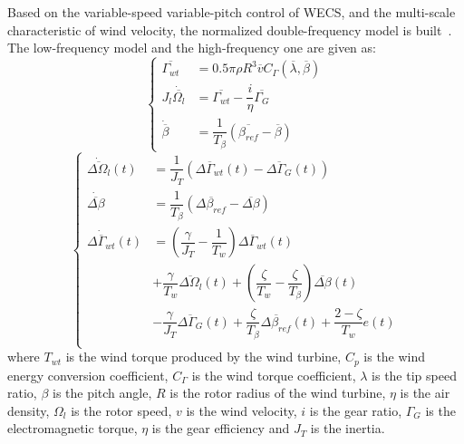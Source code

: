 \documentclass[english]{cccconf}
\begin{document}
Based on the variable-speed variable-pitch control of WECS, and the multi-scale
characteristic of wind velocity, the normalized double-frequency model is built~\cite{lit:6,lit:7}.
The low-frequency model and the high-frequency one are given as:
\begin{equation}\label{e:1}
\begin{cases}
\overline{\Gamma_{wt}}       & = 0.5\pi\rho{}R^3\overline{v}C_\Gamma(\overline{\lambda}, \overline{\beta}) \\
J_l\dot{\overline{\Omega_l}} & = \overline{\Gamma_{wt}}-\dfrac{i}{\eta}\overline{\Gamma_G} \\
\dot{\overline{\beta}}       & = \dfrac{1}{T_\beta}(\overline{\beta_{ref}} - \overline{\beta})
\end{cases}
\end{equation}
\begin{equation}\label{e:2}
\begin{cases}
\dot{\overline{\Delta\Omega_l}}(t) & = \dfrac{1}{J_T}(\overline{\Delta\Gamma_{wt}}(t) - \overline{\Delta\Gamma_G}(t)) \\
\dot{\overline{\Delta\beta}} & = \dfrac{1}{T_\beta}(\overline{\Delta\beta_{ref}} - \overline{\Delta\beta}) \\
\dot{\overline{\Delta\Gamma_{wt}}}(t) & = (\dfrac{\gamma}{J_T} - \dfrac{1}{T_w} )\overline{\Delta \Gamma_{wt} }(t) \\
				& + \dfrac{\gamma }{T_w}\overline{\Delta \Omega_l }(t) + (\dfrac{\zeta }{T_w} - \dfrac{\zeta }{T_\beta })
				\overline{\Delta\beta}(t) \\
				& - \dfrac{\gamma}{J_T}\overline{\Delta\Gamma_G}(t) + \dfrac{\zeta }{T_\beta}\overline{\Delta \beta_{ref}}(t)
				+ \dfrac{2-\zeta}{T_w}e(t) \\
\end{cases}
\end{equation}
where $T_{wt}$ is the wind torque produced by the wind turbine, $C_p$ is the wind
energy conversion coefficient, $C_\Gamma$ is the wind torque coefficient, $\lambda $
is the tip speed ratio, $\beta$ is the pitch angle, $R$ is the rotor radius of the
wind turbine, $\eta$ is the air density, $\Omega_l$ is the rotor speed, $v$ is the
wind velocity, $i$ is the gear ratio, $\Gamma_G$ is the electromagnetic torque,
$\eta$ is the gear efficiency and $J_T$ is the inertia.
\end{document}
